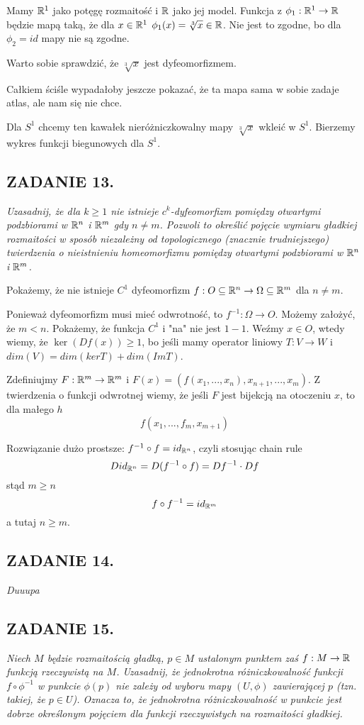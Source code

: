 \documentclass{article}
\begin{document}
Mamy $\mathbb{R}^1$ jako potęgę rozmaitość i $\mathbb{R}$ jako jej model. Funkcja z $\phi_1:\mathbb{R}^1\to\mathbb{R}$ będzie mapą taką, że dla $x\in\mathbb{R}^1$ $\phi_1(x)=\sqrt[3]{x}\in\mathbb{R}$. Nie jest to zgodne, bo dla $\phi_2=id$ mapy nie są zgodne.

Warto sobie sprawdzić, że $\sqrt[3]{x}$ jest dyfeomorfizmem.

Całkiem ściśle wypadałoby jeszcze pokazać, że ta mapa sama w sobie zadaje atlas, ale nam się nie chce.

Dla $S^1$ chcemy ten kawałek nieróżniczkowalny mapy $\sqrt[3]{x}$ wkleić w $S^1$. Bierzemy wykres funkcji biegunowych dla $S^1$.

\subsection*{ZADANIE 13.}
\emph{\color{pink}Uzasadnij, że dla $k\geq1$ nie istnieje $c^k$-dyfeomorfizm pomiędzy otwartymi podzbiorami w $\mathbb{R}^n$ i $\mathbb{R}^m$ gdy $n\neq m$. Pozwoli to określić pojęcie wymiaru gładkiej rozmaitości w sposób niezależny od topologicznego (znacznie trudniejszego) twierdzenia o nieistnieniu homeomorfizmu pomiędzy otwartymi podzbiorami w $\mathbb{R}^n$ i $\mathbb{R}^m$.}

Pokażemy, że nie istnieje $C^1$ dyfeomorfizm $f:O\subseteq\mathbb{R}^n\to\Omega\subseteq\mathbb{R}^m$ dla $n\neq m$.

Ponieważ dyfeomorfizm musi mieć odwrotność, to $f^{-1}:\Omega\to O$. Możemy założyć, że $m<n$. Pokażemy, że funkcja $C^1$ i "na" nie jest $1-1$. Weźmy $x\in O$, wtedy wiemy, że $\ker(Df(x))\geq1$, bo jeśli mamy operator liniowy $T:V\to W$ i $dim(V)=dim(ker T)+dim(Im T)$.

Zdefiniujmy $F:\mathbb{R}^m\to\mathbb{R}^m$ i $F(x)=(f(x_1,...,x_n), x_{n+1},...,x_{m})$. Z twierdzenia o funkcji odwrotnej wiemy, że jeśli $F$ jest bijekcją na otoczeniu $x$, to dla małego $h$
$$f(x_1,...,f_m,x_{m+1})$$

Rozwiązanie dużo prostsze: $f^{-1}\circ f=id_{\mathbb{R}^n}$, czyli stosując chain rule
$$Did_{\mathbb{R}^n}=D(f^{-1}\circ f)=Df^{-1}\cdot Df$$
stąd $m\geq n$
$$f\circ f^{-1}=id_{\mathbb{R}^m}$$
a tutaj $n\geq m$.

\subsection*{ZADANIE 14.}
\emph{\color{yellow}Duuupa}

\subsection*{ZADANIE 15.}
\emph{\color{yellow}Niech $M$ będzie rozmaitością gładką, $p\in M$ ustalonym punktem zaś $f:M\to\mathbb{R}$ funkcją rzeczywistą na $M$. Uzasadnij, że jednokrotna różniczkowalność funkcji $f\circ\phi^{-1}$ w punkcie $\phi(p)$ nie zależy od wyboru mapy $(U, \phi)$ zawierającej $p$ (tzn. takiej, że $p\in U$). Oznacza to, że jednokrotna różniczkowalność w punkcie jest dobrze określonym pojęciem dla funkcji rzeczywistych na rozmaitości gładkiej.}
\end{document}
